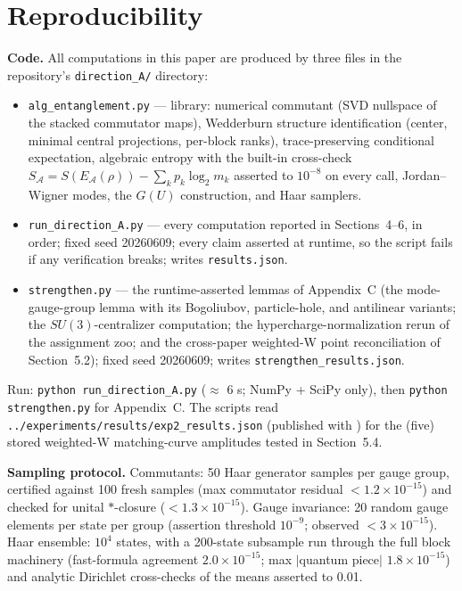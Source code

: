 \documentclass[11pt]{article}
\newcommand{\EA}{E_{\mathcal{A}}}
\newcommand{\SA}{S_{\mathcal{A}}}
\begin{document}
\appendix

\section{Reproducibility}

\textbf{Code.} All computations in this paper are produced by three files in the repository's \texttt{direction\_A/} directory:

\begin{itemize}
\item \texttt{alg\_entanglement.py} --- library: numerical commutant (SVD nullspace of the stacked commutator maps), Wedderburn structure identification (center, minimal central projections, per-block ranks), trace-preserving conditional expectation, algebraic entropy with the built-in cross-check $\SA = S(\EA(\rho)) - \sum_k p_k \log_2 m_k$ asserted to $10^{-8}$ on every call, Jordan--Wigner modes, the $G(U)$ construction, and Haar samplers.
\item \texttt{run\_direction\_A.py} --- every computation reported in Sections~4--6, in order; fixed seed 20260609; every claim asserted at runtime, so the script fails if any verification breaks; writes \texttt{results.json}.
\item \texttt{strengthen.py} --- the runtime-asserted lemmas of Appendix~C (the mode-gauge-group lemma with its Bogoliubov, particle-hole, and antilinear variants; the $SU(3)$-centralizer computation; the hypercharge-normalization rerun of the assignment zoo; and the cross-paper weighted-W point reconciliation of Section~5.2); fixed seed 20260609; writes \texttt{strengthen\_results.json}.
\end{itemize}

Run: \texttt{python run\_direction\_A.py} ($\approx$ 6 s; NumPy + SciPy only), then \texttt{python strengthen.py} for Appendix~C. The scripts read \texttt{../experiments/results/exp2\_results.json} (published with \cite{companion}) for the (five) stored weighted-W matching-curve amplitudes tested in Section~5.4.

\textbf{Sampling protocol.} Commutants: 50 Haar generator samples per gauge group, certified against 100 fresh samples (max commutator residual $< 1.2 \times 10^{-15}$) and checked for unital $*$-closure ($< 1.3 \times 10^{-15}$). Gauge invariance: 20 random gauge elements per state per group (assertion threshold $10^{-9}$; observed $< 3 \times 10^{-15}$). Haar ensemble: $10^4$ states, with a 200-state subsample run through the full block machinery (fast-formula agreement $2.0 \times 10^{-15}$; max $|$quantum piece$|$ $1.8 \times 10^{-15}$) and analytic Dirichlet cross-checks of the means asserted to 0.01.
\end{document}
